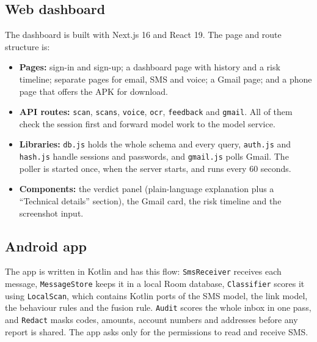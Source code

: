 {\subsection{Web dashboard}
The dashboard is built with Next.js 16 and React 19. The page and route structure is:
\begin{itemize}
\item \textbf{Pages:} sign-in and sign-up; a dashboard page with history and a risk timeline; separate pages for email, SMS and voice; a Gmail page; and a phone page that offers the APK for download.
\item \textbf{API routes:} \texttt{scan}, \texttt{scans}, \texttt{voice}, \texttt{ocr}, \texttt{feedback} and \texttt{gmail}. All of them check the session first and forward model work to the model service.
\item \textbf{Libraries:} \texttt{db.js} holds the whole schema and every query, \texttt{auth.js} and \texttt{hash.js} handle sessions and passwords, and \texttt{gmail.js} polls Gmail. The poller is started once, when the server starts, and runs every 60 seconds.
\item \textbf{Components:} the verdict panel (plain-language explanation plus a ``Technical details'' section), the Gmail card, the risk timeline and the screenshot input.
\end{itemize}

\subsection{Android app}
The app is written in Kotlin and has this flow: \texttt{SmsReceiver} receives each message, \texttt{MessageStore} keeps it in a local Room database, \texttt{Classifier} scores it using \texttt{LocalScan}, which contains Kotlin ports of the SMS model, the link model, the behaviour rules and the fusion rule. \texttt{Audit} scores the whole inbox in one pass, and \texttt{Redact} masks codes, amounts, account numbers and addresses before any report is shared. The app asks only for the permissions to read and receive SMS.

}

